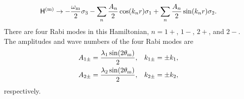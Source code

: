 \begin{equation}
  \mathsf H^{(\mm)} \to - \frac{\omega_\mm}{2}\sigma_3  - \sum_{n}\frac{A_n}{2} \cos(k_n r)  \sigma_1 + \sum_n\frac{A_n}{2} \sin(k_n r) \sigma_2.
  \label{eq-hamiltonian-bg-matter-basis-multi-frequency-drop-varying-sigma3}
\end{equation}
There are four Rabi modes in this Hamiltonian, $n=1+$, $1-$, $2+$, and $2-$. The amplitudes and wave numbers of the four Rabi modes are
\begin{align}
    A_{1\pm} &= \frac{\lambda_1 \sin (2\theta_\mathrm m)}{2}, & k_{1\pm} &= \pm k_1, \\
    A_{2\pm} &= \frac{\lambda_2 \sin (2\theta_\mathrm m)}{2}, & k_{2\pm} &= \pm k_2,
\end{align}
respectively.

